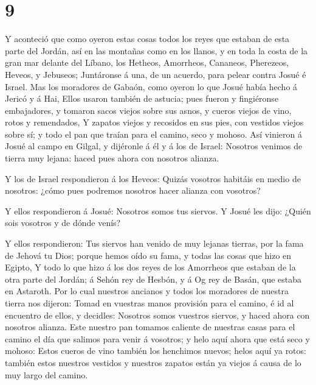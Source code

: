 \hypertarget{section-8}{%
\section{9}\label{section-8}}

 Y aconteció que como oyeron estas cosas todos los reyes que
estaban de esta parte del Jordán, así en las montañas como en los
llanos, y en toda la costa de la gran mar delante del Líbano, los
Hetheos, Amorrheos, Cananeos, Pherezeos, Heveos, y Jebuseos;
 Juntáronse á una, de un acuerdo, para pelear contra Josué é
Israel.  Mas los moradores de Gabaón, como oyeron lo que
Josué había hecho á Jericó y á Hai,  Ellos usaron también de
astucia; pues fueron y fingiéronse embajadores, y tomaron sacos viejos
sobre sus asnos, y cueros viejos de vino, rotos y remendados,
 Y zapatos viejos y recosidos en sus pies, con vestidos
viejos sobre sí; y todo el pan que traían para el camino, seco y mohoso.
 Así vinieron á Josué al campo en Gilgal, y dijéronle á él y
á los de Israel: Nosotros venimos de tierra muy lejana: haced pues ahora
con nosotros alianza.

 Y los de Israel respondieron á los Heveos: Quizás vosotros
habitáis en medio de nosotros: ¿cómo pues podremos nosotros hacer
alianza con vosotros?

 Y ellos respondieron á Josué: Nosotros somos tus siervos. Y
Josué les dijo: ¿Quién sois vosotros y de dónde venís?

 Y ellos respondieron: Tus siervos han venido de muy lejanas
tierras, por la fama de Jehová tu Dios; porque hemos oído su fama, y
todas las cosas que hizo en Egipto,  Y todo lo que hizo á
los dos reyes de los Amorrheos que estaban de la otra parte del Jordán;
á Sehón rey de Hesbón, y á Og rey de Basán, que estaba en Astaroth.
 Por lo cual nuestros ancianos y todos los moradores de
nuestra tierra nos dijeron: Tomad en vuestras manos provisión para el
camino, é id al encuentro de ellos, y decidles: Nosotros somos vuestros
siervos, y haced ahora con nosotros alianza.  Este nuestro
pan tomamos caliente de nuestras casas para el camino el día que salimos
para venir á vosotros; y helo aquí ahora que está seco y mohoso:
 Estos cueros de vino también los henchimos nuevos; helos
aquí ya rotos: también estos nuestros vestidos y nuestros zapatos están
ya viejos á causa de lo muy largo del camino.

